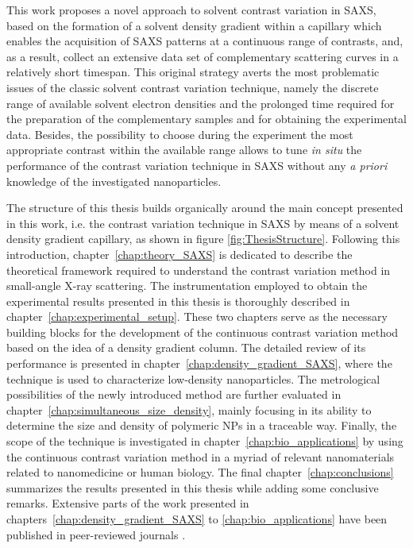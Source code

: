 This work proposes a novel approach to solvent contrast variation in SAXS, based on the formation of a solvent density gradient within a capillary which enables the acquisition of SAXS patterns at a continuous range of contrasts, and, as a result, collect an extensive data set of complementary scattering curves in a relatively short timespan. This original strategy averts the most problematic issues of the classic solvent contrast variation technique, namely the discrete range of available solvent electron densities and the prolonged time required for the preparation of the complementary samples and for obtaining the experimental data. Besides, the possibility to choose during the experiment the most appropriate contrast within the available range allows to tune \emph{in situ} the performance of the contrast variation technique in SAXS without any \emph{a priori} knowledge of the investigated nanoparticles.

The structure of this thesis builds organically around the main concept presented in this work, i.e. the contrast variation technique in SAXS by means of a solvent density gradient capillary, as shown in figure \ref{fig:ThesisStructure}. Following this introduction, chapter~\ref{chap:theory_SAXS} is dedicated to describe the theoretical framework required to understand the contrast variation method in small-angle X-ray scattering. The instrumentation employed to obtain the experimental results presented in this thesis is thoroughly described in chapter~\ref{chap:experimental_setup}. These two chapters serve as the necessary building blocks for the development of the continuous contrast variation method based on the idea of a density gradient column. The detailed review of its performance is presented in chapter~\ref{chap:density_gradient_SAXS}, where the technique is used to characterize low-density nanoparticles. The metrological possibilities of the newly introduced method are further evaluated in chapter~\ref{chap:simultaneous_size_density}, mainly focusing in its ability to determine the size and density of polymeric NPs in a traceable way. Finally, the scope of the technique is investigated in chapter~\ref{chap:bio_applications} by using the continuous contrast variation method in a myriad of relevant nanomaterials related to nanomedicine or human biology. The final chapter~\ref{chap:conclusions} summarizes the results presented in this thesis while adding some conclusive remarks. Extensive parts of the work presented in chapters~\ref{chap:density_gradient_SAXS} to \ref{chap:bio_applications} have been published in peer-reviewed journals \citep{minelli_characterization_2014,garcia-diez_nanoparticle_2015,garcia-diez_size_2016,garcia-diez_simultaneous_2016-1}.


